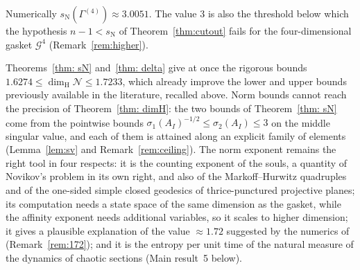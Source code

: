 \documentclass[11pt]{amsart}
\theoremstyle{definition}
\theoremstyle{remark}
\newcommand{\cN}{\mathcal N}
\newcommand{\sN}{s_{\mathrm N}}
\newcommand{\dimH}{\dim_{\mathrm H}}
\begin{document}
Numerically $\sN(\Gamma^{(4)})\approx3.0051$. The value $3$ is also the threshold below which the hypothesis $n-1<\sN$ of Theorem~\ref{thm:cutout} fails for the four-dimensional gasket $\mathcal G^4$ (Remark~\ref{rem:higher}).

\medskip
Theorems~\ref{thm: sN} and~\ref{thm: delta} give at once the rigorous bounds $1.6274\le\dimH\cN\le1.7233$, which already improve the lower and upper bounds previously available in the literature, recalled above. Norm bounds cannot reach the precision of Theorem~\ref{thm: dimH}: the two bounds of Theorem~\ref{thm: sN} come from the pointwise bounds $\sigma_1(A_I)^{-1/2}\le\sigma_2(A_I)\le3$ on the middle singular value, and each of them is attained along an explicit family of elements (Lemma~\ref{lem:sv} and Remark~\ref{rem:ceiling}). The norm exponent remains the right tool in four respects: it is the counting exponent of the souls, a quantity of Novikov's problem in its own right, and also of the Markoff--Hurwitz quadruples and of the one-sided simple closed geodesics of thrice-punctured projective planes; its computation needs a state space of the same dimension as the gasket, while the affinity exponent needs additional variables, so it scales to higher dimension; it gives a plausible explanation of the value $\approx1.72$ suggested by the numerics of~\cite{DD09} (Remark~\ref{rem:172}); and it is the entropy per unit time of the natural measure of the dynamics of chaotic sections (Main result~5 below).

\medskip
\end{document}
